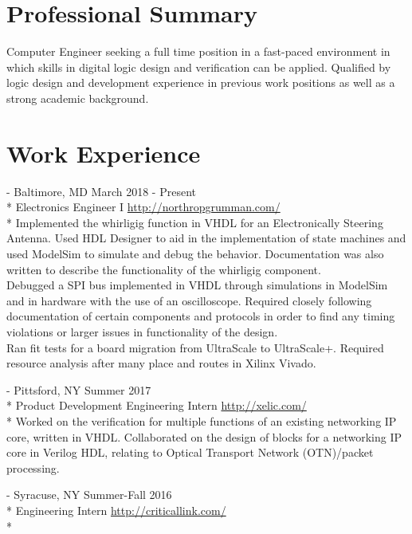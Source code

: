 \documentclass[a4paper,margin,line]{resume}
\newcommand{\rurl}[1]{\hfill {\footnotesize \url{#1}}}
\newcommand{\rdate}[1]{\hfill {\small #1}}
\renewcommand{\employer}[5]{ \item[#1] - #2 \rdate{#3} \\* #4 \rurl{#5} \\*}
\begin{document}
\begin{resume}
\section{\mysidestyle Professional Summary}
    Computer Engineer seeking a full time position in a fast-paced environment in which skills in digital logic design and verification can be applied.  Qualified by logic design and development experience in previous work positions as well as a strong academic background.


\section{\mysidestyle Work Experience}
    \begin{asparadesc}
        \employer{Northrop Grumman Corporation}{Baltimore, MD}{March 2018 - Present}{Electronics Engineer I}
        {http://northropgrumman.com/}
        \small Implemented the whirligig function in VHDL for an Electronically Steering Antenna.  Used HDL Designer to aid in the implementation of state machines and used ModelSim to simulate and debug the behavior.  Documentation was also written to describe the functionality of the whirligig component.\medskip\\
        Debugged a SPI bus implemented in VHDL through simulations in ModelSim and in hardware with the use of an oscilloscope.  Required closely following documentation of certain components and protocols in order to find any timing violations or larger issues in functionality of the design.\medskip\\
        Ran fit tests for a board migration from UltraScale to UltraScale+.  Required resource analysis after many place and routes in Xilinx Vivado.
        \\
        \employer{Xelic, Inc.}{Pittsford, NY}{Summer 2017}{Product Development Engineering Intern}
        {http://xelic.com/}
        \small Worked on the verification for multiple functions of an existing networking IP core, written in VHDL.  Collaborated on the design of blocks for a networking IP core in Verilog HDL, relating to Optical Transport Network (OTN)/packet processing.
        \\
        \employer{Critical Link LLC}{Syracuse, NY}{Summer-Fall 2016}{Engineering Intern}
        {http://criticallink.com/}
        \small

\end{asparadesc}
\end{resume}
\end{document}
